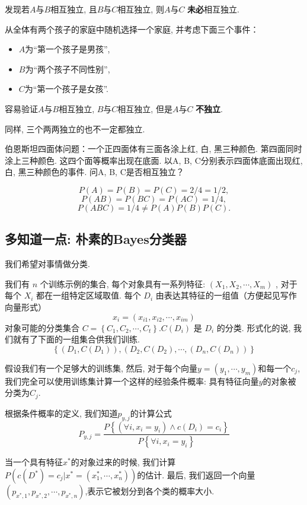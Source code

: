 发现若$A$与$B$相互独立, 且$B$与$C$相互独立, 则$A$与$C$ \textbf{未必}相互独立. 
\begin{example}
    从全体有两个孩子的家庭中随机选择一个家庭, 并考虑下面三个事件：
    \begin{itemize}
        \item $A$为``第一个孩子是男孩'', 
        \item $B$为``两个孩子不同性别'', 
        \item $C$为``第一个孩子是女孩''. 
    \end{itemize}
    容易验证$A$与$B$相互独立, $B$与$C$相互独立, 但是$A$与$C$ \textbf{不独立}. 

    同样, 三个两两独立的也不一定都独立.

    伯恩斯坦四面体问题：一个正四面体有三面各涂上红, 白, 黑三种颜色. 第四面同时涂上三种颜色. 这四个面等概率出现在底面. 以A, B, C分别表示四面体底面出现红, 白, 黑三种颜色的事件. 问A, B, C是否相互独立？

    $$
        P(A)=P(B)=P(C)=2/4=1/2,
    $$
    $$
        P(AB)=P(BC)=P(AC)=1/4,
    $$
    $$
        P(ABC)=1/4\neq P(A)P(B)P(C).
    $$
\end{example}


\subsection{多知道一点: 朴素的Bayes分类器}
我们希望对事情做分类. 

我们有 $n$ 个训练示例的集合, 每个对象具有一系列特征: $\left(X_1, X_2, \cdots, X_m\right)$ , 对于每个 $X_i$ 都在一组特定区域取值. 
每个 $D_i$ 由表达其特征的一组值（方便起见写作向量形式）
$$
x_i=\left(x_{i 1}, x_{i 2}, \cdots, x_{i m}\right)
$$
对象可能的分类集合 $C=\left\{C_1, C_2, \cdots, C_t\right\} . C\left(D_i\right)$ 是 $D_i$ 的分类. 
形式化的说, 我们就有了下面的一组集合供我们训练. 
$$\left\{\left(D_1, C\left(D_1\right)\right),\left(D_2, C\left(D_2\right), \cdots,\left(D_n, C\left(D_n\right)\right)\right\}\right.$$

假设我们有一个足够大的训练集, 然后, 对于每个向量\( y=\left(y_1, \cdots, y_m\right) \)和每一个$c_j$, 我们完全可以使用训练集计算一个这样的经验条件概率: 具有特征向量$y$的对象被分类为$C_j$.

根据条件概率的定义, 我们知道$p_{y,j}$的计算公式
$$
P_{y, j}=\frac{P\left\{\left(\forall i, x_i=y_i\right) \wedge c\left(D_i\right)=c_i\right\}}{P\left\{\forall i, x_i=y_i\right\}}
$$

当一个具有特征$x^*$的对象过来的时候, 我们计算$P(c(D^*)=c_j | x^* =(x_1^*,\cdots, x_n^*))$的估计. 最后, 我们返回一个向量$(p_{x^*, 1},p_{x^*, 2},\cdots, p_{x^*, n})$,表示它被划分到各个类的概率大小.

